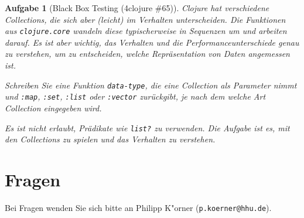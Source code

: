 \documentclass[11pt,a4paper]{article}
\newcounter{numb}
\theoremstyle{break}
\newtheorem{aufgabe}{Aufgabe}[numb]
\begin{document}
\begin{aufgabe}[Black Box Testing (4clojure \#65)]
    Clojure hat verschiedene Collections, die sich aber (leicht) im Verhalten unterscheiden.
    Die Funktionen aus \verb|clojure.core| wandeln diese typischerweise in Sequenzen um und arbeiten darauf.
    Es ist aber wichtig, das Verhalten und die Performanceunterschiede genau zu verstehen,
    um zu entscheiden, welche Repr\"asentation von Daten angemessen ist.

    Schreiben Sie eine Funktion \verb|data-type|, die eine Collection als Parameter nimmt und \verb|:map|, \verb|:set|, \verb|:list| oder \verb|:vector| zur\"uckgibt,
    je nach dem welche Art Collection eingegeben wird.

    Es ist nicht erlaubt, Pr\"adikate wie \verb|list?| zu verwenden.
    Die Aufgabe ist es, mit den Collections zu spielen und das Verhalten zu verstehen.
\end{aufgabe}

\section*{Fragen}
Bei Fragen wenden Sie sich bitte an Philipp K"orner (\texttt{p.koerner@hhu.de}).
\end{document}
